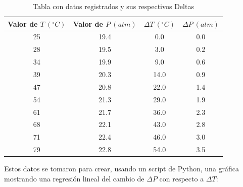 \documentclass{article}
\begin{document}
\begin{table}
    \begin{center}
        \begin{tabular}{ |c|c|c|c| }
            \hline
            Valor de $T\ (^\circ{C})$ & Valor de $P\ (atm)$ & $\Delta T\ (^\circ{C})$ & $\Delta P\ (atm)$ \\
            \hline
            25                        & 19.4                & 0.0                     & 0.0               \\
            28                        & 19.5                & 3.0                     & 0.2               \\
            34                        & 19.9                & 9.0                     & 0.6               \\
            39                        & 20.3                & 14.0                    & 0.9               \\
            47                        & 20.8                & 22.0                    & 1.4               \\
            54                        & 21.3                & 29.0                    & 1.9               \\
            61                        & 21.7                & 36.0                    & 2.3               \\
            68                        & 22.1                & 43.0                    & 2.8               \\
            71                        & 22.4                & 46.0                    & 3.0               \\
            79                        & 22.8                & 54.0                    & 3.5               \\
            \hline
        \end{tabular}
        \caption{\label{Tabla 1} Tabla con datos registrados y sus respectivos Deltas}
    \end{center}
\end{table}

\newpage

Estos datos se tomaron para crear, usando un script de Python, una gráfica mostrando una regresión lineal del cambio de $\Delta P$ con respecto a $\Delta T$:
\end{document}
